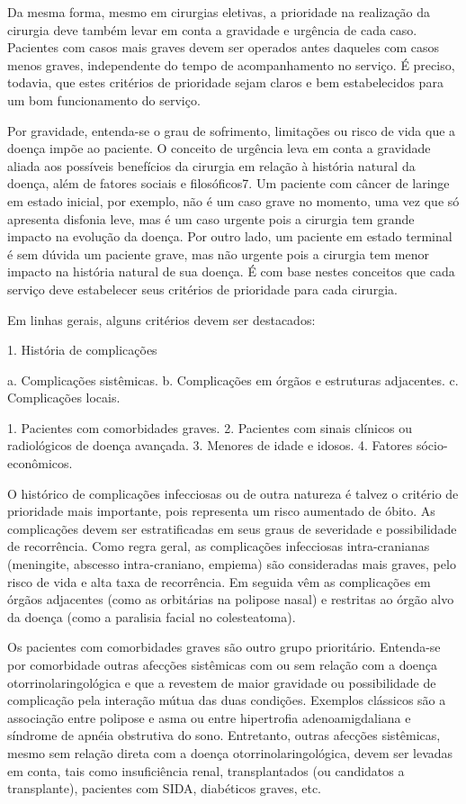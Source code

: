 Da mesma forma, mesmo em cirurgias eletivas, a prioridade na realização da cirurgia deve também levar em conta a gravidade e urgência de cada caso. Pacientes com casos mais graves devem ser operados antes daqueles com casos menos graves, independente do tempo de acompanhamento no serviço. É preciso, todavia, que estes critérios de prioridade sejam claros e bem estabelecidos para um bom funcionamento do serviço.

Por gravidade, entenda-se o grau de sofrimento, limitações ou risco de vida que a doença impõe ao paciente. O conceito de urgência leva em conta a gravidade aliada aos possíveis benefícios da cirurgia em relação à história natural da doença, além de fatores sociais e filosóficos7. Um paciente com câncer de laringe em estado inicial, por exemplo, não é um caso grave no momento, uma vez que só apresenta disfonia leve, mas é um caso urgente pois a cirurgia tem grande impacto na evolução da doença. Por outro lado, um paciente em estado terminal é sem dúvida um paciente grave, mas não urgente pois a cirurgia tem menor impacto na história natural de sua doença. É com base nestes conceitos que cada serviço deve estabelecer seus critérios de prioridade para cada cirurgia.

Em linhas gerais, alguns critérios devem ser destacados:

1. História de complicações

a. Complicações sistêmicas. 
b. Complicações em órgãos e estruturas adjacentes. 
c. Complicações locais.

1. Pacientes com comorbidades graves. 
2. Pacientes com sinais clínicos ou radiológicos de doença avançada. 
3. Menores de idade e idosos. 
4. Fatores sócio-econômicos.

O histórico de complicações infecciosas ou de outra natureza é talvez o critério de prioridade mais importante, pois representa um risco aumentado de óbito. As complicações devem ser estratificadas em seus graus de severidade e possibilidade de recorrência. Como regra geral, as complicações infecciosas intra-cranianas (meningite, abscesso intra-craniano, empiema) são consideradas mais graves, pelo risco de vida e alta taxa de recorrência. Em seguida vêm as complicações em órgãos adjacentes (como as orbitárias na polipose nasal) e restritas ao órgão alvo da doença (como a paralisia facial no colesteatoma).

Os pacientes com comorbidades graves são outro grupo prioritário. Entenda-se por comorbidade outras afecções sistêmicas com ou sem relação com a doença otorrinolaringológica e que a revestem de maior gravidade ou possibilidade de complicação pela interação mútua das duas condições. Exemplos clássicos são a associação entre polipose e asma ou entre hipertrofia adenoamigdaliana e síndrome de apnéia obstrutiva do sono. Entretanto, outras afecções sistêmicas, mesmo sem relação direta com a doença otorrinolaringológica, devem ser levadas em conta, tais como insuficiência renal, transplantados (ou candidatos a transplante), pacientes com SIDA, diabéticos graves, etc.

